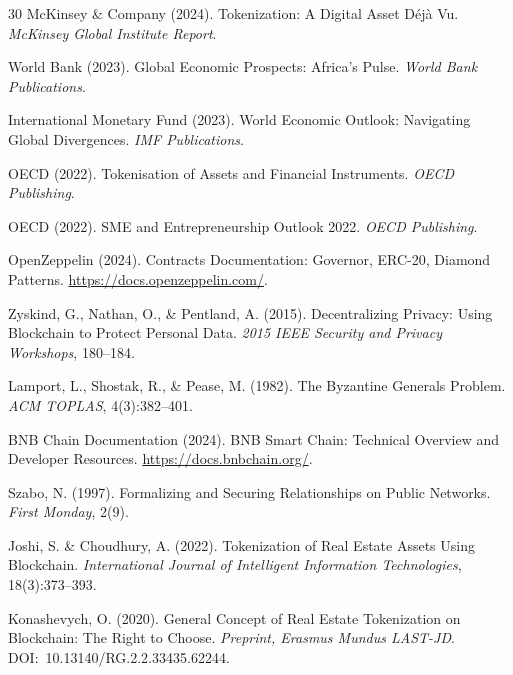 \documentclass[11pt,a4paper]{article}
\begin{document}
\begin{thebibliography}{30}
McKinsey \& Company (2024).
\newblock Tokenization: A Digital Asset D\'ej\`a Vu.
\newblock \textit{McKinsey Global Institute Report}.

World Bank (2023).
\newblock Global Economic Prospects: Africa's Pulse.
\newblock \textit{World Bank Publications}.

International Monetary Fund (2023).
\newblock World Economic Outlook: Navigating Global Divergences.
\newblock \textit{IMF Publications}.

OECD (2022).
\newblock Tokenisation of Assets and Financial Instruments.
\newblock \textit{OECD Publishing}.

OECD (2022).
\newblock SME and Entrepreneurship Outlook 2022.
\newblock \textit{OECD Publishing}.

OpenZeppelin (2024).
\newblock Contracts Documentation: Governor, ERC-20, Diamond Patterns.
\newblock \url{https://docs.openzeppelin.com/}.

Zyskind, G., Nathan, O., \& Pentland, A. (2015).
\newblock Decentralizing Privacy: Using Blockchain to Protect Personal Data.
\newblock \textit{2015 IEEE Security and Privacy Workshops}, 180--184.

Lamport, L., Shostak, R., \& Pease, M. (1982).
\newblock The Byzantine Generals Problem.
\newblock \textit{ACM TOPLAS}, 4(3):382--401.

BNB Chain Documentation (2024).
\newblock BNB Smart Chain: Technical Overview and Developer Resources.
\newblock \url{https://docs.bnbchain.org/}.

Szabo, N. (1997).
\newblock Formalizing and Securing Relationships on Public Networks.
\newblock \textit{First Monday}, 2(9).

Joshi, S. \& Choudhury, A. (2022).
\newblock Tokenization of Real Estate Assets Using Blockchain.
\newblock \textit{International Journal of Intelligent Information Technologies}, 18(3):373--393.

Konashevych, O. (2020).
\newblock General Concept of Real Estate Tokenization on Blockchain: The Right to Choose.
\newblock \textit{Preprint, Erasmus Mundus LAST-JD}. DOI:~10.13140/RG.2.2.33435.62244.


\end{thebibliography}
\end{document}
